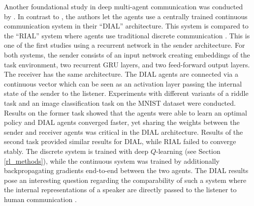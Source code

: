 Another foundational study in deep multi-agent communication was conducted by \cite{foerster2016learning}. In contrast to \cite{lazaridou2016multi}, the authors let the agents use a centrally trained continuous communication system in their ``DIAL'' architecture. This system is compared to the ``RIAL'' system where agents use traditional discrete communication \parencite[][p. 2]{foerster2016learning}. This is one of the first studies using a recurrent network in the sender architecture.
For both systems, the sender consists of an input network creating embeddings of the task environment, two recurrent GRU layers, and two feed-forward output layers.
The receiver has the same architecture. The DIAL agents are connected via a continuous vector which can be seen as an activation layer passing the internal state of the sender to the listener.
Experiments with different variants of a riddle task and an image classification task on the MNIST dataset were conducted. Results on the former task showed that the agents were able to learn an optimal policy and DIAL agents converged faster, yet sharing the weights between the sender and receiver agents was critical in the DIAL architecture. Results of the second task provided similar results for DIAL, while RIAL failed to converge stably. 
The discrete system is trained with deep $Q$-learning (see Section \ref{rl_methods}), while the continuous system was trained by additionally backpropagating gradients end-to-end between the two agents. %
The DIAL results pose an interesting question regarding the comparability of such a system where the internal representations of a speaker are directly passed to the listener to human communication \parencite[cf.][]{lazaridou2020emergent, hockett1960origin}.


